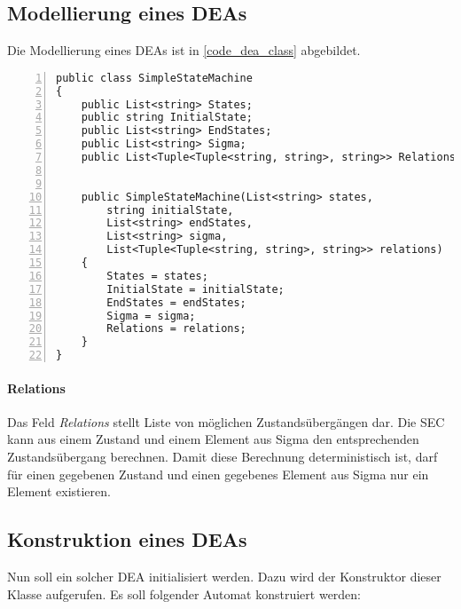 \subsection{Modellierung eines DEAs}
Die Modellierung eines DEAs ist in \ref{code_dea_class} abgebildet. 

\begin{lstlisting}[language={[Sharp]C}, breaklines=true, tabsize=2, showstringspaces=false, frame=single, numbers=left, basicstyle=\small] 
public class SimpleStateMachine
{
	public List<string> States;
	public string InitialState;
	public List<string> EndStates;
	public List<string> Sigma;
	public List<Tuple<Tuple<string, string>, string>> Relations;
	
	
	public SimpleStateMachine(List<string> states,
		string initialState,
		List<string> endStates,
		List<string> sigma,
		List<Tuple<Tuple<string, string>, string>> relations)
	{
		States = states;
		InitialState = initialState;
		EndStates = endStates;
		Sigma = sigma;
		Relations = relations;
	}
}
\end{lstlisting}\label{code_dea_class}

\paragraph*{Relations}
Das Feld \textit{Relations} stellt Liste von möglichen Zustandsübergängen dar. Die SEC kann aus einem Zustand und einem Element aus Sigma den entsprechenden Zustandsübergang berechnen. Damit diese Berechnung deterministisch ist, darf für einen gegebenen Zustand und einen gegebenes Element aus Sigma nur ein Element existieren. 

\subsection{Konstruktion eines DEAs}
Nun soll ein solcher DEA initialisiert werden. Dazu wird der Konstruktor dieser Klasse aufgerufen. Es soll folgender Automat konstruiert werden:

